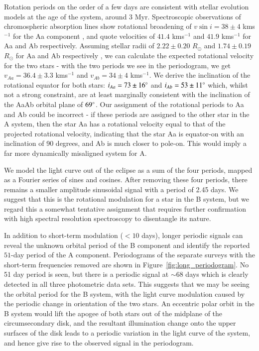 \documentclass{aa}
\def\kms{\ifmmode{\rm km\th s^{-1}}\else km\th s$^{-1}$\fi}
\def\th{\thinspace}
\begin{document}
Rotation periods on the order of a few days are consistent with stellar evolution models at the age of the system, around 3 Myr.
%
Spectroscopic observations of chromospheric absorption lines show rotational broadening of $v \sin i = 38 \pm 4$ \kms{} for the Aa component \citep{Boden07}, and \citet{Welty95} quote velocities of $41.4$ \kms{} and $41.9$ \kms{} for Aa and Ab respectively.
%
Assuming stellar radii of $2.22\pm0.20$ $R_\odot$ and $1.74\pm0.19$  $R_\odot$ for Aa and Ab respectively \citep{Boden07}, we can calculate the expected rotational velocity for the two stars - with the two periods we see in the periodogram, we get $v_{Aa} = 36.4\pm 3.3$ \kms{} and $v_{Ab} = 34\pm 4$ \kms{}.
%
We derive the inclination of the rotational equator for both stars: $i_{Aa} = 73\pm 16^\circ$ and $i_{Ab} = 53\pm 11^\circ$ which, whilst not a strong constraint, are at least marginally consistent with the inclination of the AaAb orbital plane of $69^\circ$.
%
Our assignment of the rotational periods to Aa and Ab could be incorrect - if these periods are assigned to the other star in the A system, then the star Aa has a rotational velocity equal to that of the projected rotational velocity, indicating that the star Aa is equator-on with an inclination of 90 degrees, and Ab is much closer to pole-on.
%
This would imply a far more dynamically misaligned system for A.

We model the light curve out of the eclipse as a sum of the four periods, mapped as a Fourier series of sines and cosines.
%
After removing these four periods, there remains a smaller amplitude sinusoidal signal with a period of 2.45 days.
%
We suggest that this is the rotational modulation for a star in the B system, but we regard this a somewhat tentative assignment that requires further confirmation with high spectral resolution spectroscopy to disentangle its nature.

In addition to short-term modulation ($<10$ days), longer periodic signals can reveal the unknown orbital period of the B component and identify the reported $51$-day period of the A component.
%
Periodograms of the separate surveys with the short-term frequencies removed are shown in Figure~\ref{fig:long_periodogram}.
%
No 51 day period is seen, but there is a periodic signal at $\sim 68$ days which is clearly detected in all three photometric data sets.
%
This suggests that we may be seeing the orbital period for the B system, with the light curve modulation caused by the periodic change in orientation of the two stars.
%
An eccentric polar orbit in the B system would lift the apogee of both stars out of the midplane of the circumsecondary disk, and the resultant illumination change onto the upper surfaces of the disk leads to a periodic variation in the light curve of the system, and hence give rise to the observed signal in the periodogram.
\end{document}
